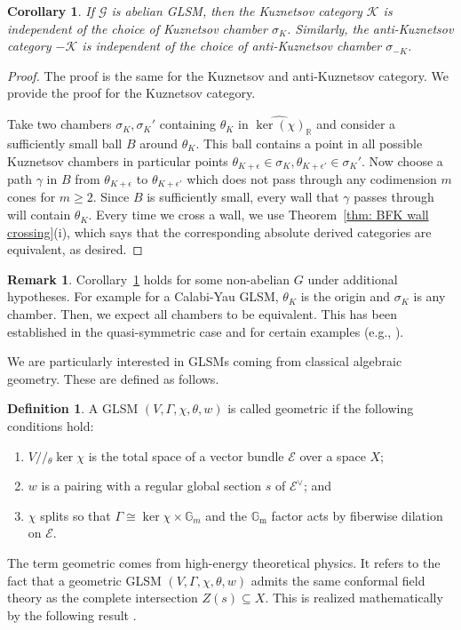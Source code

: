 \documentclass[reqno, 12pt]{amsart}
\newtheorem{corollary}[theorem]{Corollary}
\theoremstyle{definition}
\newtheorem{definition}[theorem]{Definition}
\newtheorem{remark}[theorem]{Remark}
\newcommand{\op}[1]{\operatorname{#1}}
\newcommand{\modmod}[1]{/ \! \! / \!_{#1}}
\newcommand{\newterm}{\textsf}
\def\ker{\op{\mbox{ker}}}
\def\R{\op{\mathbb{R}}}
\def\Gm{\op{\mathbb{G}_m}}
\numberwithin{equation}{section}
\begin{document}
\begin{corollary} \label{cor: independence}
If $\mathcal{G}$ is abelian GLSM, then the Kuznetsov category $\mathcal{K}$ is independent of the choice of Kuznetsov chamber $\sigma_K$. Similarly, the anti-Kuznetsov category $-\mathcal{K}$ is independent of the choice of anti-Kuznetsov chamber $\sigma_{-K}$.
\end{corollary}
\begin{proof}
The proof is the same for the Kuznetsov and anti-Kuznetsov category.  We provide the proof for the Kuznetsov category.

Take two chambers $\sigma_K, \sigma_K'$ containing $\theta_K$ in $\widehat{\ker(\chi)}_{\R}$ and consider a sufficiently small ball $B$ around $\theta_K$.  This ball contains a point in all possible Kuznetsov chambers in particular points $\theta_{K+ \epsilon} \in \sigma_K, \theta_{K+\epsilon'} \in \sigma_K'$.   Now choose a path $\gamma$  in $B$ from $\theta_{K+ \epsilon}$ to $\theta_{K+\epsilon'}$ which does not pass through any codimension $m$ cones for $m \geq 2$.  Since $B$ is sufficiently small, every wall that $\gamma$ passes through will contain $\theta_K$.  Every time we cross a wall, we use  Theorem~\ref{thm: BFK wall crossing}(i), which says that the corresponding absolute derived categories are equivalent, as desired.
\end{proof}



\begin{remark}
Corollary~\ref{cor: independence} holds for some non-abelian $G$ under additional hypotheses. For example for a Calabi-Yau GLSM, $\theta_K$ is the origin and $\sigma_K$ is any chamber.  Then, we expect all chambers to be equivalent.  This has been established in the quasi-symmetric case \cite[Corollary 5.2]{HLS} and for certain examples (e.g., \cite{KimoiEd}).  
\end{remark}


We are particularly interested in GLSMs coming from classical algebraic geometry.  These are defined as follows.

\begin{definition}\label{def: geometric}
A GLSM $(V, \Gamma, \chi, \theta, w)$ is called \newterm{geometric} if the following conditions hold:
    \begin{enumerate}
        \item $V\modmod{\theta} \ker \chi$ is the total space of a vector bundle $\mathcal E$ over a space $X$;
        \item $w$ is a pairing with a regular global section $s$ of $\mathcal E^\vee$; and 
        \item $\chi$ splits so that $\Gamma \cong \ker \chi \times \mathbb G_m$ and the $\Gm$ factor acts by fiberwise dilation on $\mathcal E$.
    \end{enumerate}
\end{definition}
 The term geometric comes from high-energy theoretical physics.  It refers to the fact that a geometric GLSM $(V, \Gamma, \chi, \theta, w)$ admits the same conformal field theory as the complete intersection $Z(s) \subseteq X$.  This is realized mathematically by the following result \cite{Isik, Shipman, Hirano}. 
\end{document}
